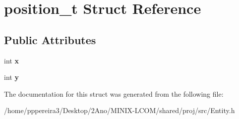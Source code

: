 \hypertarget{structposition__t}{}\section{position\+\_\+t Struct Reference}
\label{structposition__t}
\subsection*{Public Attributes}
\begin{DoxyCompactItemize}
\item 
int {\bfseries x}
\item 
int {\bfseries y}
\end{DoxyCompactItemize}


The documentation for this struct was generated from the following file\+:\begin{DoxyCompactItemize}
\item 
/home/pppereira3/\+Desktop/2\+Ano/\+M\+I\+N\+I\+X-\/\+L\+C\+O\+M/shared/proj/src/Entity.\+h\end{DoxyCompactItemize}
